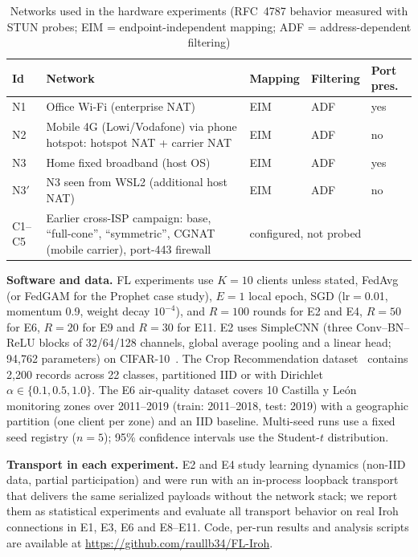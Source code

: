 \documentclass[a4paper,fleqn]{cas-dc}
\begin{document}
\begin{table}[t]
\centering
\caption{Networks used in the hardware experiments (RFC~4787 behavior measured with STUN probes; EIM = endpoint-independent mapping; ADF = address-dependent filtering)}
\label{tab:networks}
\scriptsize
\setlength{\tabcolsep}{2.5pt}
\begin{tabular}{@{}l p{3.0cm} l l l@{}}
\toprule
\textbf{Id} & \textbf{Network} & \textbf{Mapping} & \textbf{Filtering} & \textbf{Port pres.} \\
\midrule
N1 & Office Wi-Fi (enterprise NAT) & EIM & ADF & yes \\
N2 & Mobile 4G (Lowi/Vodafone) via phone hotspot: hotspot NAT + carrier NAT & EIM & ADF & no \\
N3 & Home fixed broadband (host OS) & EIM & ADF & yes \\
N3$'$ & N3 seen from WSL2 (additional host NAT) & EIM & ADF & no \\
\midrule
C1--C5 & Earlier cross-ISP campaign: base, ``full-cone'', ``symmetric'', CGNAT (mobile carrier), port-443 firewall & \multicolumn{3}{l}{configured, not probed} \\
\bottomrule
\end{tabular}
\end{table}

\textbf{Software and data.} FL experiments use $K{=}10$ clients unless stated, FedAvg (or FedGAM for the Prophet case study), $E{=}1$ local epoch, SGD (lr$=$0.01, momentum 0.9, weight decay $10^{-4}$), and $R{=}100$ rounds for E2 and E4, $R{=}50$ for E6, $R{=}20$ for E9 and $R{=}30$ for E11. E2 uses SimpleCNN (three Conv--BN--ReLU blocks of 32/64/128 channels, global average pooling and a linear head; 94{,}762 parameters) on CIFAR-10~\cite{cifar2009}. The Crop Recommendation dataset~\cite{cropdataset} contains 2{,}200 records across 22 classes, partitioned IID or with Dirichlet $\alpha \in \{0.1, 0.5, 1.0\}$. The E6 air-quality dataset covers 10 Castilla y Le\'on monitoring zones over 2011--2019 (train: 2011--2018, test: 2019) with a geographic partition (one client per zone) and an IID baseline. Multi-seed runs use a fixed seed registry ($n{=}5$); 95\% confidence intervals use the Student-$t$ distribution.

\textbf{Transport in each experiment.} E2 and E4 study learning dynamics (non-IID data, partial participation) and were run with an in-process loopback transport that delivers the same serialized payloads without the network stack; we report them as statistical experiments and evaluate all transport behavior on real Iroh connections in E1, E3, E6 and E8--E11. Code, per-run results and analysis scripts are available at \url{https://github.com/raullb34/FL-Iroh}.
\end{document}
